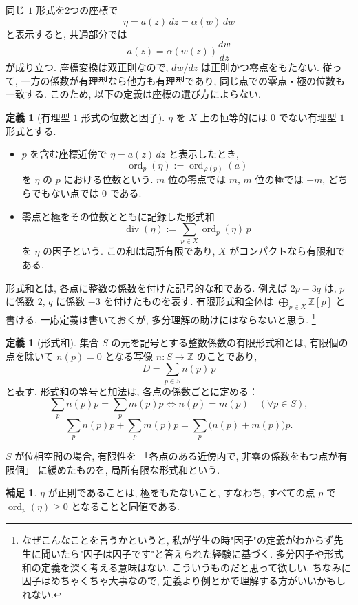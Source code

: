 \documentclass[dvipdfmx,a4paper,11pt]{article} %
\newcommand{\Z}{\mathbb{Z}}
\theoremstyle{definition}
\numberwithin{equation}{section}
\newtheorem{dfn}[thm]{定義}
\newtheorem{rem}[thm]{補足}
\begin{document}
同じ $1$ 形式を2つの座標で
\[
\eta=a(z)\,dz=\alpha(w)\,dw
\]
と表示すると, 共通部分では
\[
a(z)=\alpha(w(z))\frac{dw}{dz}
\]
が成り立つ.
座標変換は双正則なので, $dw/dz$ は正則かつ零点をもたない.
従って, 一方の係数が有理型なら他方も有理型であり, 
同じ点での零点・極の位数も一致する.
このため, 以下の定義は座標の選び方によらない.

\begin{dfn}[有理型 $1$ 形式の位数と因子]\label{O-M093}
$\eta$ を $X$ 上の恒等的には $0$ でない有理型 $1$ 形式とする.
\begin{itemize}
\item
$p$ を含む座標近傍で $\eta=a(z)\,dz$ と表示したとき, 
\[
\operatorname{ord}_p(\eta):=\operatorname{ord}_{\varphi(p)}(a)
\]
を $\eta$ の $p$ における位数という.
$m$ 位の零点では $m$, $m$ 位の極では $-m$, 
どちらでもない点では $0$ である.

\item
零点と極をその位数とともに記録した形式和
\[
\operatorname{div}(\eta)
:=\sum_{p\in X}\operatorname{ord}_p(\eta)\,p
\]
を $\eta$ の因子という.
この和は局所有限であり, $X$ がコンパクトなら有限和である.
\end{itemize}
\end{dfn}

形式和とは, 各点に整数の係数を付けた記号的な和である.
例えば $2p-3q$ は, $p$ に係数 $2$, $q$ に係数 $-3$ を付けたものを表す.
有限形式和全体は $\bigoplus_{p\in X}\Z[p]$ と書ける.
一応定義は書いておくが, 多分理解の助けにはならないと思う. \footnote{なぜこんなことを言うかというと, 私が学生の時"因子"の定義がわからず先生に聞いたら"因子は因子です"と答えられた経験に基づく. 多分因子や形式和の定義を深く考える意味はない. こういうものだと思って欲しい. ちなみに因子はめちゃくちゃ大事なので, 定義より例とかで理解する方がいいかもしれない.}

\begin{dfn}[形式和]\label{rem-locally-finite-divisor}
集合 $S$ の元を記号とする整数係数の有限形式和とは, 
有限個の点を除いて $n(p)=0$ となる写像 $n:S\to\Z$ のことであり, 
\[
D=\sum_{p\in S}n(p)\,p
\]
と表す.
形式和の等号と加法は, 各点の係数ごとに定める：
\[
\sum_p n(p)p=\sum_p m(p)p
\iff n(p)=m(p)\quad(\forall p\in S),
\]
\[
\sum_p n(p)p+\sum_p m(p)p
=\sum_p\bigl(n(p)+m(p)\bigr)p.
\]

$S$ が位相空間の場合, 有限性を
「各点のある近傍内で, 非零の係数をもつ点が有限個」
に緩めたものを, 局所有限な形式和という.
\end{dfn}


\begin{rem}
$\eta$ が正則であることは, 極をもたないこと, 
すなわち, すべての点 $p$ で
$\operatorname{ord}_p(\eta)\geq0$ となることと同値である.
\end{rem}
\end{document}

